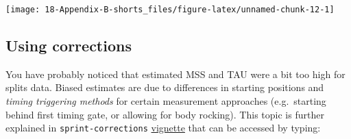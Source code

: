 \documentclass[
]{book}
\newenvironment{Shaded}{\begin{snugshade}}{\end{snugshade}}
\newcommand{\DataTypeTok}[1]{\textcolor[rgb]{0.13,0.29,0.53}{#1}}
\newcommand{\DecValTok}[1]{\textcolor[rgb]{0.00,0.00,0.81}{#1}}
\newcommand{\KeywordTok}[1]{\textcolor[rgb]{0.13,0.29,0.53}{\textbf{#1}}}
\newcommand{\NormalTok}[1]{#1}
\newcommand{\OperatorTok}[1]{\textcolor[rgb]{0.81,0.36,0.00}{\textbf{#1}}}
\newcommand{\StringTok}[1]{\textcolor[rgb]{0.31,0.60,0.02}{#1}}
\begin{document}
\begin{Shaded}
\end{Shaded}

\begin{center}\texttt{[image: 18-Appendix-B-shorts\_files/figure-latex/unnamed-chunk-12-1]} \end{center}

\hypertarget{using-corrections}{%
\subsection{Using corrections}\label{using-corrections}}

You have probably noticed that estimated MSS and TAU were a bit too high for splits data. Biased estimates are due to differences in starting positions and \emph{timing triggering methods} for certain measurement approaches (e.g.~starting behind first timing gate, or allowing for body rocking). This topic is further explained in \texttt{sprint-corrections} \href{https://mladenjovanovic.github.io/shorts/articles/sprint-corrections.html}{vignette} that can be accessed by typing:
\end{document}
